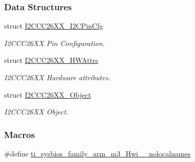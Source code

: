 \subsubsection*{Data Structures}
\begin{DoxyCompactItemize}
\item 
struct \hyperlink{struct_i2_c_c_c26_x_x___i2_c_pin_cfg}{I2\+C\+C\+C26\+X\+X\+\_\+\+I2\+C\+Pin\+Cfg}
\begin{DoxyCompactList}\small\item\em I2\+C\+C\+C26\+X\+X Pin Configuration. \end{DoxyCompactList}\item 
struct \hyperlink{struct_i2_c_c_c26_x_x___h_w_attrs}{I2\+C\+C\+C26\+X\+X\+\_\+\+H\+W\+Attrs}
\begin{DoxyCompactList}\small\item\em I2\+C\+C\+C26\+X\+X Hardware attributes. \end{DoxyCompactList}\item 
struct \hyperlink{struct_i2_c_c_c26_x_x___object}{I2\+C\+C\+C26\+X\+X\+\_\+\+Object}
\begin{DoxyCompactList}\small\item\em I2\+C\+C\+C26\+X\+X Object. \end{DoxyCompactList}\end{DoxyCompactItemize}
\subsubsection*{Macros}
\begin{DoxyCompactItemize}
\item 
\#define \hyperlink{_i2_c_c_c26_x_x_8h_aaa17ecf48f5762e2e1bdb0bab8aacf0c}{ti\+\_\+sysbios\+\_\+family\+\_\+arm\+\_\+m3\+\_\+\+Hwi\+\_\+\+\_\+nolocalnames}
\end{DoxyCompactItemize}
